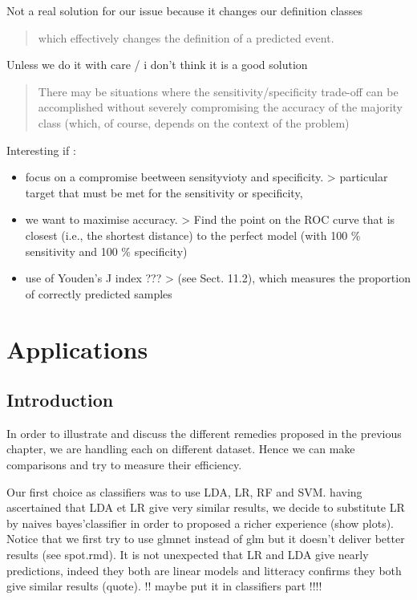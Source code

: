 \documentclass[
]{report}
\providecommand{\tightlist}{%
  \setlength{\itemsep}{0pt}\setlength{\parskip}{0pt}}
\begin{document}
Not a real solution for our issue because it changes our definition classes

\begin{quote}
which eﬀectively changes the deﬁnition of a predicted event.
\end{quote}

Unless we do it with care / i don't think it is a good solution

\begin{quote}
There may be situations where the sensitivity/speciﬁcity trade-oﬀ can be accomplished without severely compromising the accuracy of the majority class (which, of course, depends on the context of the problem)
\end{quote}

Interesting if :

\begin{itemize}
\tightlist
\item
  focus on a compromise beetween sensityvioty and specificity.
  \textgreater{} particular target that must be met for the sensitivity or speciﬁcity,
\item
  we want to maximise accuracy.
  \textgreater{} Find the point on the ROC curve that is closest (i.e., the shortest distance) to the perfect model (with 100 \% sensitivity and 100 \% speciﬁcity)
\item
  use of Youden's J index ???
  \textgreater{} (see Sect. 11.2), which measures the proportion of correctly predicted samples
\end{itemize}

\hypertarget{applications}{%
\chapter{Applications}\label{applications}}

\hypertarget{introduction-1}{%
\section{Introduction}\label{introduction-1}}

In order \citep{xie2015} to illustrate and discuss the different remedies proposed in the previous chapter, we are handling each on different dataset. Hence we can make comparisons and try to measure their efficiency.

Our first choice as classifiers was to use LDA, LR, RF and SVM. having ascertained that LDA et LR give very similar results, we decide to substitute LR by naives bayes'classifier in order to proposed a richer experience (show plots). Notice that we first try to use glmnet instead of glm but it doesn't deliver better results (see spot.rmd). It is not unexpected that LR and LDA give nearly predictions, indeed they both are linear models and litteracy confirms they both give similar results (quote). !! maybe put it in classifiers part !!!!
\end{document}
